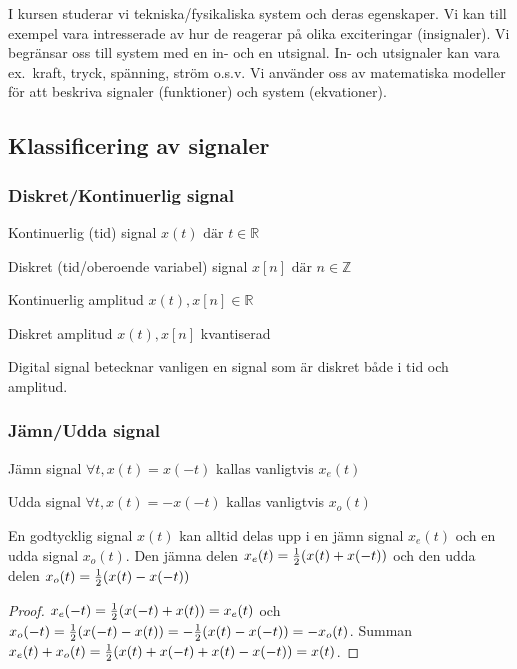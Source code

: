 \documentclass[a4paper]{article}
\begin{document}
\providecommand\fname{}
\renewcommand\fname{19-09-03}

I kursen studerar vi tekniska/fysikaliska system och deras egenskaper. Vi kan 
till exempel vara intresserade av hur de reagerar på olika exciteringar 
(insignaler). Vi begränsar oss till system med en in- och en utsignal. 
In- och utsignaler kan vara ex.\ kraft, tryck, spänning, ström o.s.v. 
Vi använder oss av matematiska modeller för att beskriva signaler 
(funktioner) och system (ekvationer). 

\subsection{Klassificering av signaler}
\subsubsection{Diskret/Kontinuerlig signal}
Kontinuerlig (tid) signal \(
    x(t) \text{ där } t \in \mathbb{R}
\)

Diskret (tid/oberoende variabel) signal \(
    x[n] \text{ där } n \in \mathbb{Z}
\) 

Kontinuerlig amplitud \(
    x(t), x[n] \in \mathbb{R}
\) 

Diskret amplitud \(
    x(t), x[n] 
\) kvantiserad

Digital signal betecknar vanligen en signal som är diskret både i tid och 
amplitud.

\subsubsection{Jämn/Udda signal}
Jämn signal \(
    \forall t, x(t) = x(-t)
\) kallas vanligtvis \(
    x_e(t)
\) 

Udda signal \(
    \forall t, x(t) = -x(-t)
\) kallas vanligtvis \(
    x_o(t)
\) 

\begin{thm}
En godtycklig signal \(
    x(t)
\) kan alltid delas upp i en jämn signal \(
    x_e(t)
\) och en udda signal \(
    x_o(t)
\). Den jämna delen \(
    x_e(t) = \frac{1}{2} (x(t) + x(-t))
\) och den udda delen \(
    x_o(t) = \frac{1}{2} (x(t) - x(-t))
\) 
\begin{proof}
    \(
        x_e(-t) = \frac{1}{2} (x(-t) + x(t)) = x_e(t)
    \) och \(
        x_o(-t) = \frac{1}{2} (x(-t) - x(t)) = - \frac{1}{2} (x(t) - x(-t)) = - x_o(t)
    \). Summan \(
        x_e(t) + x_o(t) = \frac{1}{2} (x(t) + x(-t) + x(t) - x(-t)) = x(t)
    \).
\end{proof}

\end{thm}
\end{document}
